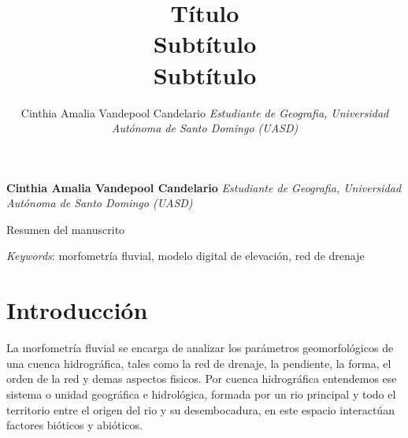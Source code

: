 \documentclass[11pt,]{article}
\title{Título\\
Subtítulo\\
Subtítulo  }
\author{\Large Cinthia Amalia Vandepool Candelario\vspace{0.05in} \newline\normalsize\emph{Estudiante de Geografia, Universidad Autónoma de Santo Domingo (UASD)}  }
\date{}
\newcommand*{\authorfont}{\fontfamily{phv}\selectfont}
\renewenvironment{abstract}
 {{%
    \setlength{\leftmargin}{0mm}
    \setlength{\rightmargin}{\leftmargin}%
  }%
  \relax}
 {\endlist}
\begin{document}
	
%

{%
\setlength{\parindent}{0pt}
\thispagestyle{plain}
{\fontsize{18}{20}\selectfont\raggedright 
\maketitle  %

}

{
   \vskip 13.5pt\relax \normalsize\fontsize{11}{12} 
\textbf{\authorfont Cinthia Amalia Vandepool Candelario} \hskip 15pt \emph{\small Estudiante de Geografia, Universidad Autónoma de Santo Domingo (UASD)}   

}

}








\begin{abstract}

    \hbox{\vrule height .2pt width 39.14pc}

    \vskip 8.5pt %

\noindent Resumen del manuscrito


\vskip 8.5pt \noindent \emph{Keywords}: morfometría fluvial, modelo digital de elevación, red de drenaje \par

    \hbox{\vrule height .2pt width 39.14pc}



\end{abstract}


\vskip 6.5pt


\noindent  \section{Introducción}\label{introducciuxf3n}

La morfometría fluvial se encarga de analizar los parámetros
geomorfológicos de una cuenca hidrográfica, tales como la red de
drenaje, la pendiente, la forma, el orden de la red y demas aspectos
fisicos. Por cuenca hidrográfica entendemos ese sistema o unidad
geográfica e hidrológica, formada por un rio principal y todo el
territorio entre el origen del rio y su desembocadura, en este espacio
interactúan factores bióticos y abióticos.
\end{document}
